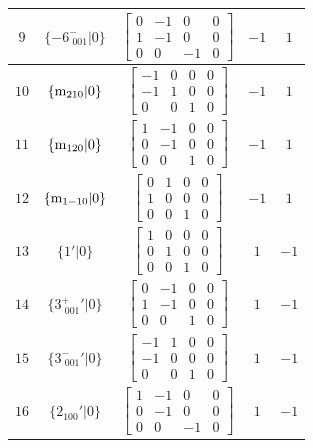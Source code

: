 \documentclass[fleqn,8pt]{jsarticle}
\begin{document}
\begin{longtable}{ccccc}
$ 9 $ & $ \{-6^{-}_{\,\,001}|0\} $ & $ \begin{bmatrix} 0 & -1 & 0 & 0 \\ 1 & -1 & 0 & 0 \\ 0 & 0 & -1 & 0 \end{bmatrix} $ & $ -1 $ & $ 1 $ \\ \hline
$ 10 $ & $ \{{\rm m}_{210}|0\} $ & $ \begin{bmatrix} -1 & 0 & 0 & 0 \\ -1 & 1 & 0 & 0 \\ 0 & 0 & 1 & 0 \end{bmatrix} $ & $ -1 $ & $ 1 $ \\ \hline
$ 11 $ & $ \{{\rm m}_{120}|0\} $ & $ \begin{bmatrix} 1 & -1 & 0 & 0 \\ 0 & -1 & 0 & 0 \\ 0 & 0 & 1 & 0 \end{bmatrix} $ & $ -1 $ & $ 1 $ \\ \hline
$ 12 $ & $ \{{\rm m}_{1-10}|0\} $ & $ \begin{bmatrix} 0 & 1 & 0 & 0 \\ 1 & 0 & 0 & 0 \\ 0 & 0 & 1 & 0 \end{bmatrix} $ & $ -1 $ & $ 1 $ \\ \hline
$ 13 $ & $ \{1{}'|0\} $ & $ \begin{bmatrix} 1 & 0 & 0 & 0 \\ 0 & 1 & 0 & 0 \\ 0 & 0 & 1 & 0 \end{bmatrix} $ & $ 1 $ & $ -1 $ \\ \hline
$ 14 $ & $ \{3^{+}_{\,\,001}{}'|0\} $ & $ \begin{bmatrix} 0 & -1 & 0 & 0 \\ 1 & -1 & 0 & 0 \\ 0 & 0 & 1 & 0 \end{bmatrix} $ & $ 1 $ & $ -1 $ \\ \hline
$ 15 $ & $ \{3^{-}_{\,\,001}{}'|0\} $ & $ \begin{bmatrix} -1 & 1 & 0 & 0 \\ -1 & 0 & 0 & 0 \\ 0 & 0 & 1 & 0 \end{bmatrix} $ & $ 1 $ & $ -1 $ \\ \hline
$ 16 $ & $ \{2{}_{100}{}'|0\} $ & $ \begin{bmatrix} 1 & -1 & 0 & 0 \\ 0 & -1 & 0 & 0 \\ 0 & 0 & -1 & 0 \end{bmatrix} $ & $ 1 $ & $ -1 $ \\ \hline

\end{longtable}
\end{document}
